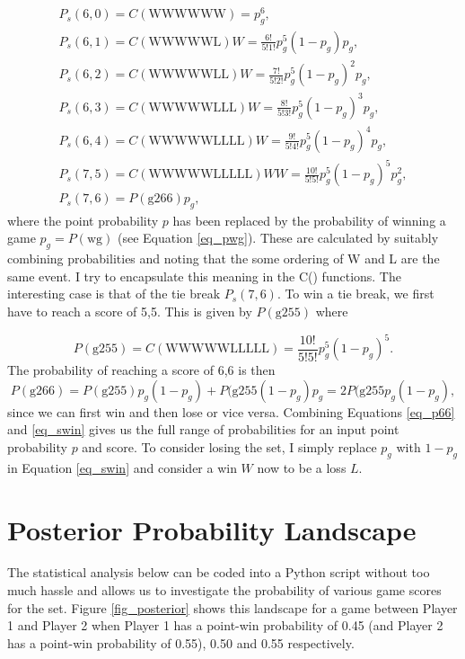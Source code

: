 \documentclass[10pt]{article}
\begin{document}
\begin{equation}
\label{eq_swin}
\begin{split}
P_s(6,0) = C(\mathrm{WWWWWW}) = p_g^6, \\
P_s(6,1) = C(\mathrm{WWWWWL}) W = \frac{6!}{5!1!}p_g^5 (1-p_g) p_g, \\
P_s(6,2) = C(\mathrm{WWWWWLL}) W = \frac{7!}{5!2!}p_g^5 (1-p_g)^2 p_g, \\
P_s(6,3) = C(\mathrm{WWWWWLLL}) W = \frac{8!}{5!3!}p_g^5 (1-p_g)^3 p_g, \\
P_s(6,4) = C(\mathrm{WWWWWLLLL}) W = \frac{9!}{5!4!}p_g^5 (1-p_g)^4 p_g, \\
P_s(7,5) = C(\mathrm{WWWWWLLLLL}) WW = \frac{10!}{5!5!}p_g^5 (1-p_g)^5 p_g^2, \\
P_s(7,6) = P(\mathrm{g266}) p_g,
\end{split}
\end{equation}
\noindent where the point probability $p$ has been replaced by the probability of winning a game $p_g = P(\mathrm{wg})$ (see Equation \ref{eq_pwg}). These are calculated by suitably combining probabilities and noting that the some ordering of W and L are the same event. I try to encapsulate this meaning in the C() functions. The interesting case is that of the tie break $P_s(7,6)$. To win a tie break, we first have to reach a score of 5,5. This is given by $P(\mathrm{g255})$ where

\begin{equation}
\label{eq_p55}
P(\mathrm{g255}) = C(\mathrm{WWWWWLLLLL}) = \frac{10!}{5!5!}p_g^5 (1-p_g)^5.
\end{equation}
\noindent The probability of reaching a score of 6,6 is then
\begin{equation}
\label{eq_p66}
P(\mathrm{g266}) = P(\mathrm{g255})p_g (1-p_g) + P(\mathrm{g255} (1-p_g)p_g = 2P(\mathrm{g255}p_g (1-p_g),
\end{equation}
\noindent since we can first win and then lose or vice versa. Combining Equations \ref{eq_p66} and \ref{eq_swin} gives us the full range of probabilities for an input point probability $p$ and score. To consider losing the set, I simply replace $p_g$ with $1-p_g$ in Equation \ref{eq_swin} and consider a win $W$ now to be a loss $L$.






\section{Posterior Probability Landscape}
The statistical analysis below can be coded into a Python script without too much hassle and allows us to investigate the probability of various game scores for the set. Figure \ref{fig_posterior} shows this landscape for a game between Player 1 and Player 2 when Player 1 has a point-win probability of 0.45 (and Player 2 has a point-win probability of 0.55), 0.50 and 0.55 respectively. 
\end{document}
